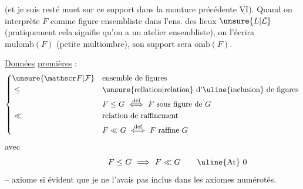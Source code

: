 (et je suis resté muet sur ce support dans la mouture précédente  $\underline{\overline{\mathrm{VI}}}$). Quand on interprète $F$ comme figure ensembliste dans l'ens. des lieux $\unsure{L|\mathcal L}$  (pratiquement cela signifie qu'on a un atelier ensembliste), on l'écrira $\mathrm{mulomb}(F)$ (petite multiombre), son support sera $\mathrm{omb}(F)$.

\uline{Données} \uline{premières} :
\[
\left\{\begin{aligned}
&\unsure{\mathscr F|\mathcal F} &&\text{ensemble de figures}\\
&\leq &&\text{\unsure{rellation|relation} d'\uline{inclusion} de figures}\\
& &&F\leq G\ \overset{\text{déf}}{\Longleftrightarrow}\ F\ \text{sous figure de }G\\
&\ll &&\text{relation de raffinement}\\
& && F\ll G\ \overset{\text{def}}{\Longleftrightarrow}\ F\ \text{raffine }G
\end{aligned}\right.
\]
avec
\[
F\leq G\ \Longrightarrow\ F\ll G\tag*{\makebox[0pt][r]{\makebox[\displaywidth][l]{\uline{At} 0}}}
\]
-- axiome si évident que je ne l'avais pas inclus dans les axiomes numérotés.

